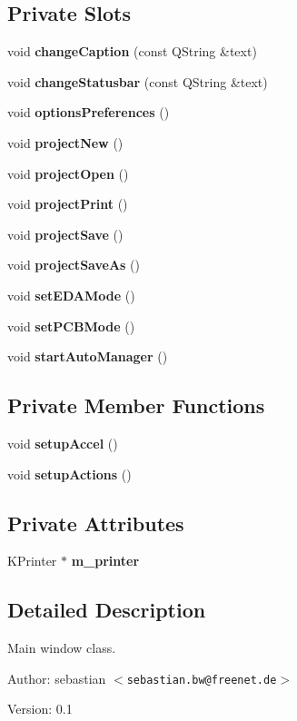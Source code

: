 \subsection*{Private Slots}
\begin{CompactItemize}
\item 
void {\bf change\-Caption} (const QString \&text)
\item 
void {\bf change\-Statusbar} (const QString \&text)
\item 
void {\bf options\-Preferences} ()
\item 
void {\bf project\-New} ()
\item 
void {\bf project\-Open} ()
\item 
void {\bf project\-Print} ()
\item 
void {\bf project\-Save} ()
\item 
void {\bf project\-Save\-As} ()
\item 
void {\bf set\-EDAMode} ()
\item 
void {\bf set\-PCBMode} ()
\item 
void {\bf start\-Auto\-Manager} ()
\end{CompactItemize}
\subsection*{Private Member Functions}
\begin{CompactItemize}
\item 
void {\bf setup\-Accel} ()
\item 
void {\bf setup\-Actions} ()
\end{CompactItemize}
\subsection*{Private Attributes}
\begin{CompactItemize}
\item 
KPrinter $\ast$ {\bf m\_\-printer}
\end{CompactItemize}


\subsection{Detailed Description}
Main window class. 

\begin{Desc}
\item[Author:]sebastian $<${\tt sebastian.bw@freenet.de}$>$ \end{Desc}
\begin{Desc}
\item[Version:]0.1 \end{Desc}




